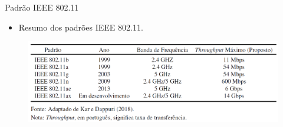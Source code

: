 \documentclass[aspectratio=169,12pt]{beamer}
\begin{document}
\begin{frame}{Padrão IEEE 802.11}
	\begin{itemize}
		\item Resumo dos padrões IEEE 802.11.
	\end{itemize}
	\vspace*{-.5cm}
	\begin{figure}[H]
		\centering
		\includegraphics[scale=.445]{fig_tcc/ieee_802_11.png}
	\end{figure}
\end{frame}
\end{document}
